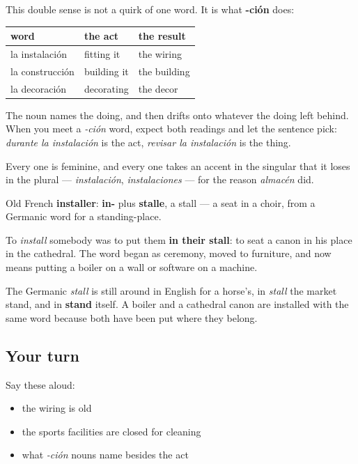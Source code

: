 \begin{grammarlens}[title={Grammar Lens: -ción names the act and then the result}]
This double sense is not a quirk of one word. It is what \textbf{-ción} does:

\noindent
\begin{tabularx}{\linewidth}{@{}>{\raggedright\arraybackslash}X>{\raggedright\arraybackslash}X>{\raggedright\arraybackslash}X@{}}
\toprule
\textbf{word} & \textbf{the act} & \textbf{the result} \\
\midrule
la instalación & fitting it & the wiring \\
la construcción & building it & the building \\
la decoración & decorating & the decor \\
\bottomrule
\end{tabularx}

The noun names the doing, and then drifts onto whatever the doing left behind. When you meet a \emph{-ción} word, expect both readings and let the sentence pick: \emph{durante la instalación} is the act, \emph{revisar la instalación} is the thing.

Every one is feminine, and every one takes an accent in the singular that it loses in the plural — \emph{instalación}, \emph{instalaciones} — for the reason \emph{almacén} did.
\end{grammarlens}

\begin{cousinweb}
Old French \textbf{installer}: \textbf{in-} plus \textbf{stalle}, a stall — a seat in a choir, from a Germanic word for a standing-place.

To \emph{install} somebody was to put them \textbf{in their stall}: to seat a canon in his place in the cathedral. The word began as ceremony, moved to furniture, and now means putting a boiler on a wall or software on a machine.

The Germanic \emph{stall} is still around in English for a horse's, in \emph{stall} the market stand, and in \textbf{stand} itself. A boiler and a cathedral canon are installed with the same word because both have been put where they belong.
\end{cousinweb}

\subsection*{Your turn}
Say these aloud:

\begin{itemize}
\raggedright
  \item the wiring is old
  \item the sports facilities are closed for cleaning
  \item what \emph{-ción} nouns name besides the act
\end{itemize}

